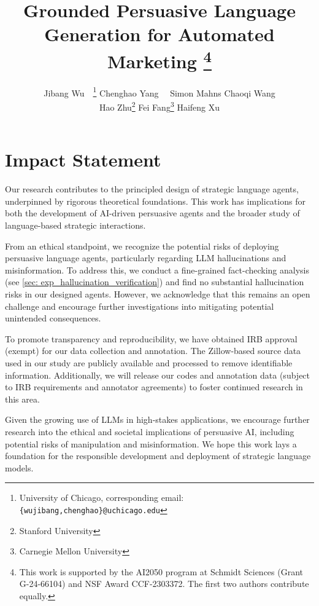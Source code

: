 \documentclass{article}
\title{Grounded Persuasive Language Generation for Automated Marketing \thanks{This work is supported by the AI2050 program at Schmidt Sciences (Grant G-24-66104)  and NSF Award CCF-2303372. The first two authors contribute equally. } }
\author{%
  Jibang Wu\footnotemark[1]\ \ \thanks{ 
  University of Chicago, corresponding email: \texttt{\{wujibang,chenghao\}@uchicago.edu}}
  \quad
   Chenghao Yang\footnotemark[1]\ \ \footnotemark[2]
   \quad
   Simon Mahns\footnotemark[2]
  \quad
   Chaoqi Wang\footnotemark[2] 
    \\\And
   Hao Zhu\thanks{ Stanford University} 
   \quad
   Fei Fang\thanks{ 
  Carnegie Mellon University}
  \quad
   Haifeng Xu\footnotemark[2]
}
\begin{document}
\maketitle
\setcounter{footnote}{0} 









\section*{Impact Statement}
Our research contributes to the principled design of strategic language agents, underpinned by rigorous theoretical foundations. This work has implications for both the development of AI-driven persuasive agents and the broader study of language-based strategic interactions.

From an ethical standpoint, we recognize the potential risks of deploying persuasive language agents, particularly regarding LLM hallucinations and misinformation. To address this, we conduct a fine-grained fact-checking analysis (see \cref{sec: exp_hallucination_verification}) and find no substantial hallucination risks in our designed agents. However, we acknowledge that this remains an open challenge and encourage further investigations into mitigating potential unintended consequences.

To promote transparency and reproducibility, we have obtained IRB approval (exempt) for our data collection and annotation. The Zillow-based source data used in our study are publicly available and processed to remove identifiable information. Additionally, we will release our codes and annotation data (subject to IRB requirements and annotator agreements) to foster continued research in this area.

Given the growing use of LLMs in high-stakes applications, we encourage further research into the ethical and societal implications of persuasive AI, including potential risks of manipulation and misinformation. We hope this work lays a foundation for the responsible development and deployment of strategic language models.




\appendix

\end{document}
